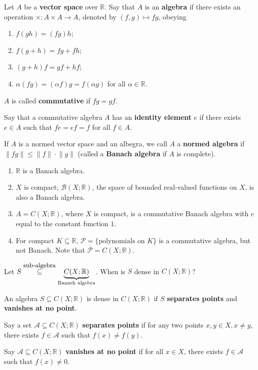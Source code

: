 \documentclass[letterpaper, reqno,11pt]{article}
\newcommand{\RR}{\mathbb{R}}
\begin{document}
\begin{defn}
  \normalfont Let $A$ be a {\bf vector space} over $\RR$. Say that $A$ is an {\bf algebra} if there exists an operation $\times : A \times A \to A$, denoted by $(f, g) \mapsto fg$, obeying
  \begin{enumerate}
  \item $f(gh) = (fg)h$;
  \item $f(g + h) = fg + fh$;
  \item $(g + h)f = gf + hf$;
  \item $\alpha(fg) = (\alpha f)g = f(\alpha g)$ for all $\alpha \in \RR$.
  \end{enumerate}

  $A$ is called {\bf commutative} if $fg = gf$.

  Say that a commutative algebra $A$ has an {\bf identity element} $e$ if there exists $e \in A$ such that $fe = ef = f$ for all $f \in A$.

  If $A$ is a normed vector space and an albegra, we call $A$ a {\bf normed algebra} if $\lVert fg \rVert \leq \lVert f \rVert \cdot \lVert g \rVert$ (called a {\bf Banach algebra} if $A$ is complete).
\end{defn}

\begin{enumerate}
\item $\RR$ is a Banach algebra.
\item $X$ is compact; $\mathcal B(X; \RR)$, the space of bounded real-valued functions on $X$, is also a Banach algebra.
\item $A = C(X; \RR)$, where $X$ is compact, is a commutative Banach algebra with $e$ equal to the constant function $1$.
\item For compact $K \subseteq \RR$, $\mathcal P = \{ \text{polynomials on $K$} \}$ is a commutative algebra, but not Banach. Note that $\overline{\mathcal P} = C(X; \RR)$.
\end{enumerate}

 Let $S \overset{\text{\small sub-algebra}}{\subseteq} \underbrace{C(X; \RR)}_\text{Banach algebra}$. When is $S$ dense in $C(X; \RR)$?

\begin{thm}
  \normalfont An algebra $S \subseteq C(X; \RR)$ is dense in $C(X; \RR)$ if $S$ {\bf separates points} and {\bf vanishes at no point}.
\end{thm}

\begin{defn}
  \normalfont
  Say a set $\mathcal A \subseteq C(X; \RR)$ {\bf separates points} if for any two points $x, y \in X, x \neq y$, there exists $f \in \mathcal A$ such that $f(x) \neq f(y)$.
\end{defn}

\begin{defn}
  \normalfont
  Say $\mathcal A \subseteq C(X; \RR)$ {\bf vanishes at no point} if for all $x \in X$, there exists $f \in \mathcal A$ such that $f(x) \neq 0$.
\end{defn}
\end{document}
